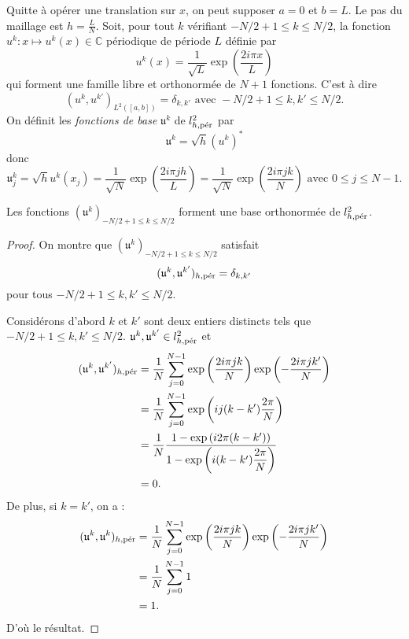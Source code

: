 Quitte à opérer une translation sur $x$, on peut supposer $a=0$ et $b=L$. Le pas du maillage est $h = \frac{L}{N}$.
Soit, pour tout $k$ vérifiant $-N/2+1 \leq k \leq N/2$, la fonction $u^k : x \mapsto u^k(x) \in \mathbb{C}$ périodique de période $L$ définie par 
\begin{equation}
u^k(x) = \dfrac{1}{\sqrt{L}} \exp \left( \dfrac{2 i \pi x}{L} \right)
\end{equation}
qui forment une famille libre et orthonormée de $N+1$ fonctions. C'est à dire
\begin{equation}
(u^k, u^{k'})_{L^2([a,b])} = \delta_{k,k'} \text{ avec } -N/2+1 \leq k, k' \leq N/2.
\end{equation}
On définit les \textit{fonctions de base} $\mathfrak{u}^k$ de $l^2_{h,\per}$ par
\begin{equation}
\mathfrak{u}^k = \sqrt{h} (u^k)^*
\end{equation}
donc 
\begin{equation}
\mathfrak{u}^k_j = \sqrt{h}  u^k(x_j) = \dfrac{1}{\sqrt{N}} \exp \left( \dfrac{2 i \pi j h}{L} \right) = \dfrac{1}{\sqrt{N}} \exp \left( \dfrac{2 i \pi j k}{N} \right) \text{ avec } 0 \leq j \leq N-1.
\label{eq:base_fourier_disc}
\end{equation}


\begin{proposition}
Les fonctions $(\mathfrak{u}^k)_{-N/2+1 \leq k \leq N/2}$ forment une base orthonormée de $l^2_{h,\per}$.
\end{proposition}

\begin{proof}
On montre que $(\mathfrak{u}^k)_{-N/2+1 \leq k \leq N/2}$ satisfait
\begin{equation}
(\mathfrak{u}^k, \mathfrak{u}^{k'})_{h,\per} = \delta_{k,k'}
\end{equation}
pour tous $-N/2+1 \leq k, k' \leq N/2$.

Considérons d'abord $k$ et $k'$ sont deux entiers distincts tels que $-N/2+1 \leq k, k' \leq N/2$. $\mathfrak{u}^k, \mathfrak{u}^{k'} \in l^2_{h,\per}$ et
\begin{align*}
(\mathfrak{u}^k, \mathfrak{u}^{k'})_{h,\per} & = \dfrac{1}{N} \gsum_{j=0}^{N-1} \exp \left( \dfrac{2 i \pi j k}{N} \right) \exp \left( -\dfrac{2 i \pi j k'}{N} \right) \\
		& = \dfrac{1}{N} \gsum_{j=0}^{N-1} \exp \left( i j (k-k') \dfrac{2 \pi}{N} \right)\\
		& = \dfrac{1}{N} \dfrac{1 - \exp \left( i 2 \pi (k-k') \right)}{1 - \exp \left( i (k-k') \dfrac{2 \pi}{N}  \right)} \\
		& = 0.
\end{align*}
De plus, si $k=k'$, on a :
\begin{align*}
(\mathfrak{u}^k, \mathfrak{u}^{k})_{h,\per} & = \dfrac{1}{N} \gsum_{j=0}^{N-1} \exp \left( \dfrac{2 i \pi j k}{N} \right) \exp \left( -\dfrac{2 i \pi j k'}{N} \right) \\
		& = \dfrac{1}{N} \gsum_{j=0}^{N-1} 1 \\
		& = 1.
\end{align*}
D'où le résultat.
\end{proof}

